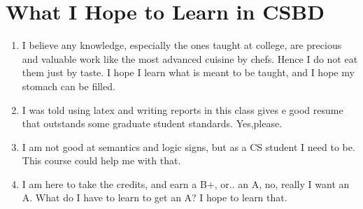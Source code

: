 \documentclass{article}
\begin{document}
\section{What I Hope to Learn in CSBD}
\label{sec:what-i-hope}
\begin{enumerate}
\item I believe any knowledge, especially the ones taught at college,
are precious and valuable work like the most advanced cuisine by
chefs. Hence I do not eat them just by taste. I hope I learn what is
meant to be taught, and I hope my stomach can be filled.
\item I was told using latex and writing reports in this class gives
e good resume that outstands some graduate student standards. Yes,please.
\item I am not good at semantics and logic signs, but as a CS student
  I need to be. This course could help me with that.
\item I am here to take the credits, and earn a B+, or.. an A, no,
  really I want an A. What do I have to learn to get an A? I hope to
  learn that.
\end{enumerate}
\end{document}
